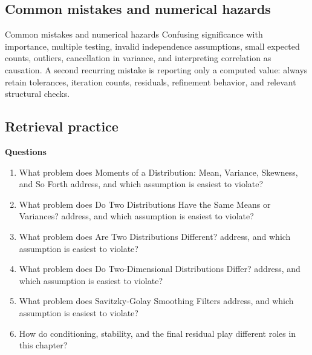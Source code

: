 \documentclass[10pt,letterpaper]{article}
\begin{document}
\subsection*{Common mistakes and numerical hazards}
\begin{warnbox}{Common mistakes and numerical hazards}
Confusing significance with importance, multiple testing, invalid independence assumptions, small expected counts, outliers, cancellation in variance, and interpreting correlation as causation.  A second recurring mistake is reporting only a computed value: always retain tolerances, iteration counts, residuals, refinement behavior, and relevant structural checks.
\end{warnbox}

\subsection*{Retrieval practice}
\textbf{Questions}
\begin{enumerate}
\item What problem does Moments of a Distribution: Mean, Variance, Skewness, and So Forth address, and which assumption is easiest to violate?
\item What problem does Do Two Distributions Have the Same Means or Variances? address, and which assumption is easiest to violate?
\item What problem does Are Two Distributions Different? address, and which assumption is easiest to violate?
\item What problem does Do Two-Dimensional Distributions Differ? address, and which assumption is easiest to violate?
\item What problem does Savitzky-Golay Smoothing Filters address, and which assumption is easiest to violate?
\item How do conditioning, stability, and the final residual play different roles in this chapter?
\end{enumerate}
\end{document}
